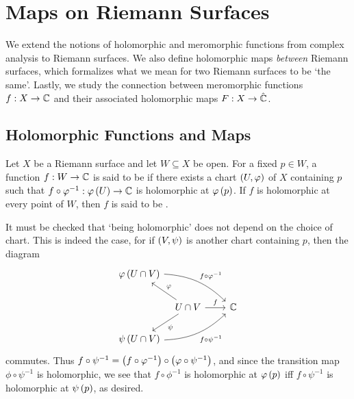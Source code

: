 \documentclass[../Moduli_Spaces_of_Riemann_Surfaces.tex]{subfiles}
\begin{document}
    \section{Maps on Riemann Surfaces}\label{sec:maps_on_Riemann_surfaces}
    We extend the notions of holomorphic and meromorphic functions from complex analysis to Riemann surfaces. We also define holomorphic maps \textit{between} Riemann surfaces, which formalizes what we mean for two Riemann surfaces to be `the same'. Lastly, we study the connection between meromorphic functions $f:X\to\mathbb{C}$ and their associated holomorphic maps $F:X\to\hat{\mathbb{C}}$.
    \subsection{Holomorphic Functions and Maps}
    \begin{definition}
        Let $X$ be a Riemann surface and let $W\subseteq X$ be open. For a fixed $p\in W$, a function $f:W\to\mathbb{C}$ is said to be  if there exists a chart $\left(U,\varphi\right)$ of $X$ containing $p$ such that $f\circ\varphi^{-1}:\varphi\left(U\right)\to\mathbb{C}$ is holomorphic at $\varphi\left(p\right)$. If $f$ is holomorphic at every point of $W$, then $f$ is said to be .
    \end{definition}
    \begin{remark}
        It must be checked that $\textrm{`}$being holomorphic$\textrm{'}$ does not depend on the choice of chart. This is indeed the case, for if $\left(V,\psi\right)$ is another chart containing $p$, then the diagram
        \begin{equation}\label{RS:eqn:holomorphic_function_well_defined}
            \begin{tikzcd}[column sep = 0.1in]
                \phi\l(U\cap V\r) \ar[drrrr, "f\circ\phi^{-1}", bend left = 20] \\
                & U\cap V \ar[ul, "\phi"'] \ar[dl, "\psi"] \ar[rrr, "f"] & & & \C \\
                \psi\l(U\cap V\r) \ar [urrrr, "f\circ\psi^{-1}"', bend right = 20]
            \end{tikzcd}
        \end{equation}
        commutes. Thus $f\circ\psi^{-1}=\left(f\circ\varphi^{-1}\right)\circ\left(\varphi\circ\psi^{-1}\right)$, and since the transition map $\phi\circ\psi^{-1}$ is holomorphic, we see that $f\circ\phi^{-1}$ is holomorphic at $\varphi\left(p\right)$ iff $f\circ\psi^{-1}$ is holomorphic at $\psi\left(p\right)$, as desired.\exqed
    \end{remark}
\end{document}
